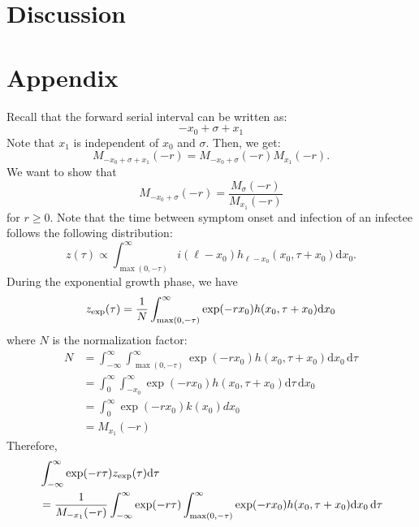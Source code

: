 \documentclass[12pt]{article}
\begin{document}
\section{Discussion}

\section*{Appendix}

Recall that the forward serial interval can be written as:
\begin{equation}
- x_0 + \sigma + x_1
\end{equation}
Note that $x_1$ is independent of $x_0$ and $\sigma$. Then, we get:
\begin{equation}
M_{- x_0 + \sigma + x_1}(-r) = M_{- x_0 + \sigma}(-r) M_{x_1}(-r).
\end{equation}
We want to show that 
\begin{equation}
M_{- x_0 + \sigma}(-r)= \frac{M_\sigma(-r)}{M_{x_1}(-r)}
\end{equation}
for $r \geq 0$.
Note that the time between symptom onset and infection of an infectee follows the following distribution:
\begin{equation}
z(\tau) \propto \int_{\max(0, -\tau)}^\infty i(\ell - x_0) h_{\ell - x_0}(x_0, \tau+x_0) \mathrm{d} x_0.
\end{equation}
During the exponential growth phase, we have
\begin{equation}
\begin{aligned}
z_{\tiny\textrm{exp}}(\tau) &= \frac{1}{N} \int_{\max(0, -\tau)}^\infty \exp(- r x_0) h(x_0, \tau+x_0) \mathrm{d} x_0\\
\end{aligned}
\end{equation}
where $N$ is the normalization factor:
\begin{equation}
\begin{aligned}
N &= \int_{-\infty}^\infty \int_{\max(0, -\tau)}^\infty \exp(- r x_0) h(x_0, \tau+x_0) \mathrm{d} x_0\,\mathrm{d}\tau\\
&= \int_{0}^\infty \int_{-x_0}^\infty \exp(- r x_0) h(x_0, \tau+x_0) \mathrm{d}\tau\,\mathrm{d} x_0\\
&= \int_{0}^\infty \exp(- r x_0) k(x_0) dx_0\\
&= M_{x_1}(-r)
\end{aligned}
\end{equation}
Therefore,
\begin{equation}
\begin{aligned}
&\int_{-\infty}^{\infty} \exp(-r\tau) z_{\tiny\textrm{exp}}(\tau) \mathrm{d}\tau\\
&=\frac{1}{M_{-x_1}(-r)} \int_{-\infty}^{\infty} \exp(-r\tau) \int_{\max(0, -\tau)}^\infty \exp(- r x_0) h(x_0, \tau+x_0) \mathrm{d} x_0\, \mathrm{d}\tau
\end{aligned}
\end{equation}
\end{document}
